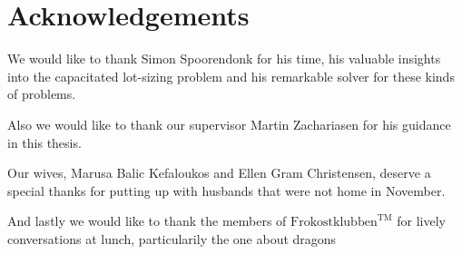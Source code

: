 \section*{Acknowledgements}

We would like to thank Simon Spoorendonk for his time, his valuable insights
into the capacitated lot-sizing problem and his remarkable solver for
these kinds of problems.

Also we would like to thank our supervisor Martin Zachariasen for his
guidance in this thesis.

Our wives, Marusa Balic Kefaloukos and Ellen Gram Christensen, deserve
a special thanks for putting up with husbands that were not home in
November.

And lastly we would like to thank the members of
$\text{Frokostklubben}^{\text{TM}}$ for lively conversations at lunch,
particularily the one about dragons
